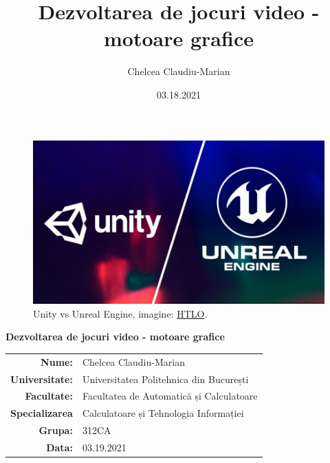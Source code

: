 \documentclass[12pt]{article}
\author{Chelcea Claudiu-Marian}
\title{Dezvoltarea de jocuri video - motoare grafice}
\date{03.18.2021}
\begin{document}
\begin{titlepage}
  \afterpage{\pagecolor{white}}%
  \LARGE
  \begin{center}
  \begin{figure}
  \includegraphics[width=\linewidth]{UnrealUnity.jpg}
  \caption{Unity vs Unreal Engine,  imagine: \href{https://www.htlo.co.uk/unity-vs-unreal-engine-a-quick-comparison/}{HTLO}.}
  \label{fig:UvsUE}

\end{figure}

    {\bfseries Dezvoltarea de jocuri video - motoare grafice}\\[3em]
    {\large
      \begin{tabular}{rl}
      \textbf{Nume:} & Chelcea Claudiu-Marian \\
	\textbf{Universitate:} & Universitatea Politehnica din București \\
	\textbf{Facultate:} & Facultatea de Automatică și Calculatoare  \\
      \textbf{Specializarea} & Calculatoare și Tehnologia Informației  \\
	\textbf{Grupa:} & 312CA \\
 	\textbf{Data:} & 03.19.2021 
	
      \end{tabular}%
    }
  \end{center}
\end{titlepage}

\newpage
\tableofcontents

\newpage
\end{document}
